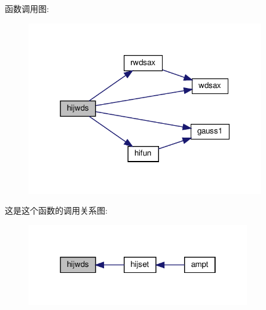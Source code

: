 函数调用图\+:
\nopagebreak
\begin{figure}[H]
\begin{center}
\leavevmode
\includegraphics[width=292pt]{hijwds_8f90_a6f361e36d3b8d2e5a02ed19276485643_cgraph}
\end{center}
\end{figure}
这是这个函数的调用关系图\+:
\nopagebreak
\begin{figure}[H]
\begin{center}
\leavevmode
\includegraphics[width=274pt]{hijwds_8f90_a6f361e36d3b8d2e5a02ed19276485643_icgraph}
\end{center}
\end{figure}
